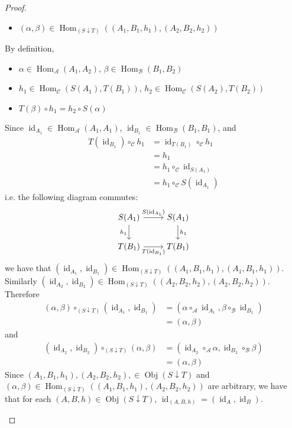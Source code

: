 \documentclass{book}
\theoremstyle{definition}
\newcommand{\al}{\alpha}
\newcommand{\be}{\beta}
\newcommand{\MA}{\mathcal{A}}
\newcommand{\MB}{\mathcal{B}}
\newcommand{\MC}{\mathcal{C}}
\DeclareMathOperator{\id}{id}
\DeclareMathOperator{\Obj}{Obj}
\DeclareMathOperator{\Hom}{Hom}
\DeclareMathOperator*{\0}{\mbf{0}}
\DeclareMathOperator*{\1}{\mbf{1}}
\begin{document}
\begin{proof}
\begin{itemize}
\begin{itemize}
				\item $(\al, \be) \in \Hom_{(S \downarrow T)}((A_1, B_1, h_1), (A_2, B_2, h_2))$ 
			\end{itemize}
			By definition, 
			\begin{itemize}
				\item $\al \in \Hom_{\MA}(A_1, A_2)$, $\be \in \Hom_{\MB}(B_1, B_2)$
				\item $h_1 \in \Hom_{\MC}(S(A_1), T(B_1))$, $h_2 \in \Hom_{\MC}(S(A_2), T(B_2))$ 
				\item $T(\be) \circ h_1 = h_2 \circ S(\al)$
			\end{itemize}
			Since $\id_{A_1} \in \Hom_{\MA}(A_1, A_1)$, $\id_{B_1} \in \Hom_{\MB}(B_1, B_1)$, and
			\begin{align*}
				T(\id_{B_1}) \circ_{\MC}  h_1 
				& = \id_{T(B_1)} \circ_{\MC} h_1 \\
				& = h_1 \\
				& = h_1 \circ_{\MC} \id_{S(A_1)} \\
				& = h_1 \circ_{\MC} S(\id_{A_1}) 
			\end{align*}
			i.e. the following diagram commutes:
			\[
			\begin{tikzcd}
				S(A_1) \arrow[r, "S(\id_{A_1})"] \arrow[d, "h_1"']  & S(A_1)  \arrow[d, "h_1"] \\
				T(B_1) \arrow[r, "T(\id_{B_1})"']                   & T(B_1)
			\end{tikzcd}
			\]
			we have that $(\id_{A_1}, \id_{B_1}) \in \Hom_{(S \downarrow T)}((A_1, B_1, h_1), (A_1, B_1, h_1))$. Similarly $(\id_{A_2}, \id_{B_2}) \in \Hom_{(S \downarrow T)}((A_2, B_2, h_2), (A_2, B_2, h_2))$. Therefore
			\begin{align*}
				(\al, \be) \circ_{(S \downarrow T)} (\id_{A_1}, \id_{B_1}) 
				& = (\al \circ_{\MA} \id_{A_1}, \be \circ_{\MB} \id_{B_1}) \\
				& = (\al, \be)
			\end{align*}
			and 
			\begin{align*}
				(\id_{A_2}, \id_{B_2}) \circ_{(S\downarrow T)} (\al, \be) 
				& = (\id_{A_2} \circ_{\MA} \al ,  \id_{B_2} \circ_{\MB} \be ) \\
				& = (\al, \be)
			\end{align*}
			Since $(A_1, B_1, h_1), (A_2, B_2, h_2), \in \Obj(S \downarrow T)$ and\\ $(\al, \be) \in \Hom_{(S \downarrow T)}((A_1, B_1, h_1), (A_2, B_2, h_2))$ are arbitrary, we have that for each $(A, B, h) \in \Obj(S \downarrow T)$, $\id_{(A, B, h)} = (\id_A, \id_B)$.
		\end{itemize}
	\end{proof}
\end{document}
